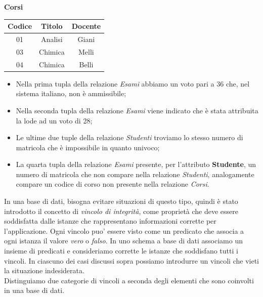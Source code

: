 \documentclass[12pt]{report}
\begin{document}
	\begin{center}
		\textbf{Corsi}

		\vspace{0.3cm}

		\begin{tabular}{|c|c|c|}
			\hline
			\textbf{Codice} & \textbf{Titolo} & \textbf{Docente} \\
			\hline
			01 & Analisi & Giani \\
			03 & Chimica & Melli \\
			04 & Chimica & Belli \\
			\hline
		\end{tabular}
	\end{center}
	\begin{itemize}
		\item Nella prima tupla della relazione \textit{Esami} abbiamo un voto pari a 36 che, nel sistema italiano, non è ammissibile;
		\item Nella seconda tupla della relazione \textit{Esami} viene indicato che è stata attribuita la lode ad un voto di 28;
		\item Le ultime due tuple della relazione \textit{Studenti} troviamo lo stesso numero di matricola che è impossibile in quanto univoco;
		\item La quarta tupla della relazione \textit{Esami} presente, per l'attributo \textbf{Studente}, un numero di matricola che non compare nella relazione \textit{Studenti}, analogamente compare un codice di corso non presente nella relazione \textit{Corsi}.
	\end{itemize}
	In una base di dati, bisogna evitare situazioni di questo tipo, quindi è stato introdotto il concetto di \textit{vincolo di integrità}, come proprietà che deve essere soddisfatta dalle istanze che rappresentano informazioni corrette per l'applicazione. Ogni vincolo puo' essere visto come un predicato che associa a ogni istanza il valore \textit{vero} o \textit{falso}. In uno schema a base di dati associamo un insieme di predicati e consideriamo corrette le istanze che soddisfano tutti i vincoli. In ciascuno dei casi discussi sopra possiamo introdurre un vincoli che vieti la situazione indesiderata. \\
	Distinguiamo due categorie di vincoli a seconda degli elementi che sono coinvolti in una base di dati.
\end{document}
